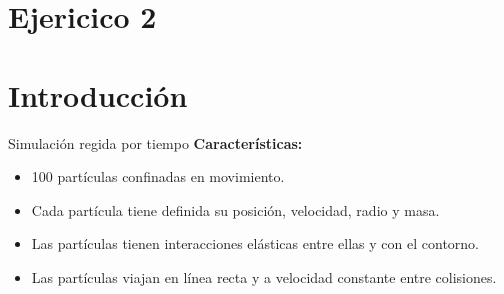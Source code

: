 \section{Ejericico 2}\label{sec:ejer2}


\section{Introducción}\label{sec:introduccion}
\begin{frame}{Simulación regida por tiempo}
    \textbf{Características:}
    \begin{itemize}
        \item 100 partículas confinadas en movimiento.
        \item Cada partícula tiene definida su posición, velocidad, radio y masa.
        \item Las partículas tienen interacciones elásticas entre ellas y con el contorno.
        \item Las partículas viajan en línea recta y a velocidad constante entre colisiones.
    \end{itemize}
\end{frame}

